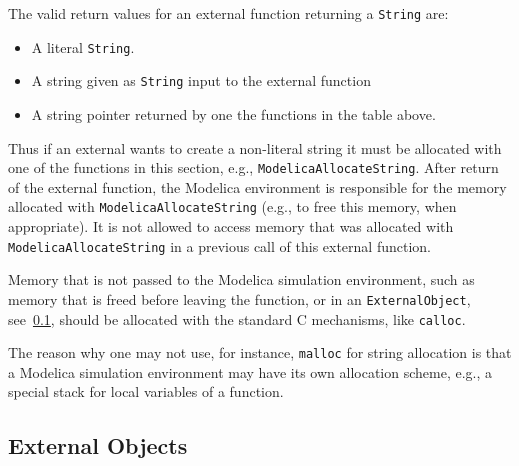 The valid return values for an external function returning a \lstinline!String! are:
\begin{itemize}
\item A literal \lstinline!String!.
\item A string given as \lstinline!String! input to the external function
\item A string pointer returned by one the functions in the table above.
\end{itemize}

Thus if an external wants to create a non-literal string it must be allocated with one of the functions in this section, e.g., \lstinline[language=C]!ModelicaAllocateString!.  After return of the external function, the Modelica environment is responsible for the memory allocated with \lstinline[language=C]!ModelicaAllocateString! (e.g., to free this memory, when appropriate).  It is not allowed to access memory that was allocated with \lstinline[language=C]!ModelicaAllocateString! in a previous call of this external function.

\begin{nonnormative}
Memory that is not passed to the Modelica simulation environment, such as memory that is freed before leaving the function, or in an \lstinline!ExternalObject!,
see~\cref{external-objects}, should be allocated with the standard C mechanisms, like \lstinline[language=C]!calloc!.
\end{nonnormative}

\begin{nonnormative}
The reason why one may not use, for instance, \lstinline[language=C]!malloc! for string allocation is that a Modelica simulation environment may have
its own allocation scheme, e.g., a special stack for local variables of a function.
\end{nonnormative}

\subsection{External Objects}\label{external-objects}

